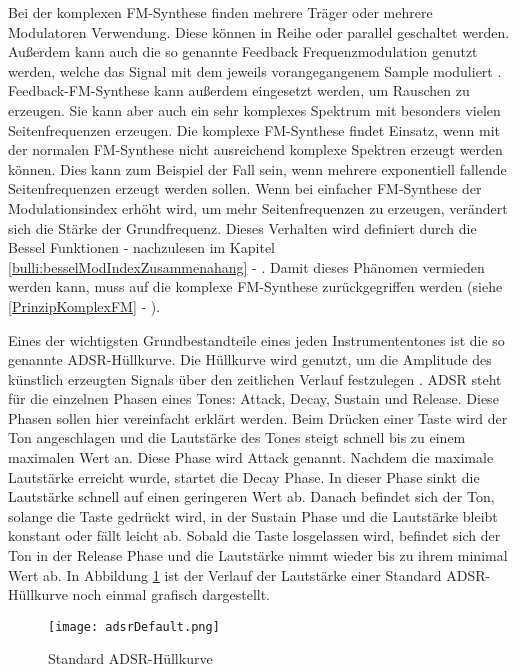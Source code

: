 Bei der komplexen FM-Synthese finden mehrere Träger oder mehrere Modulatoren Verwendung. Diese können in Reihe oder parallel geschaltet werden. Außerdem kann auch die so genannte Feedback Frequenzmodulation genutzt werden, welche das Signal mit dem jeweils vorangegangenem Sample moduliert \cite[S. 399 f.]{hornerPaper}. Feedback-FM-Synthese kann außerdem eingesetzt werden, um Rauschen zu erzeugen. Sie kann aber auch ein sehr komplexes Spektrum mit besonders vielen Seitenfrequenzen erzeugen. Die komplexe FM-Synthese findet Einsatz, wenn mit der normalen FM-Synthese nicht ausreichend komplexe Spektren erzeugt werden können. Dies kann zum Beispiel der Fall sein, wenn mehrere exponentiell fallende Seitenfrequenzen erzeugt werden sollen. Wenn bei einfacher FM-Synthese der Modulationsindex erhöht wird, um mehr Seitenfrequenzen zu erzeugen, verändert sich die Stärke der Grundfrequenz. Dieses Verhalten wird definiert durch die Bessel Funktionen - nachzulesen im Kapitel \ref{bulli:besselModIndexZusammenahang} - . Damit dieses Phänomen vermieden werden kann, muss auf die komplexe FM-Synthese zurückgegriffen werden (siehe \ref{PrinzipKomplexFM} - ).

Eines der wichtigsten Grundbestandteile eines jeden Instrumententones ist die so genannte ADSR-Hüllkurve. Die Hüllkurve wird genutzt, um die Amplitude des künstlich erzeugten Signals über den zeitlichen Verlauf festzulegen \cite[S. 532f]{chowningPaper}. ADSR steht für die einzelnen Phasen eines Tones: Attack, Decay, Sustain und Release. Diese Phasen sollen hier vereinfacht erklärt werden. Beim Drücken einer Taste wird der Ton angeschlagen und die Lautstärke des Tones steigt schnell bis zu einem maximalen Wert an. Diese Phase wird Attack genannt. Nachdem die maximale Lautstärke erreicht wurde, startet die Decay Phase. In dieser Phase sinkt die Lautstärke schnell auf einen geringeren Wert ab. Danach befindet sich der Ton, solange die Taste gedrückt wird, in der Sustain Phase und die Lautstärke bleibt konstant oder fällt leicht ab. Sobald die Taste losgelassen wird, befindet sich der Ton in der Release Phase und die Lautstärke nimmt wieder bis zu ihrem minimal Wert ab. In Abbildung \ref{fig:adsrDefault} ist der Verlauf der Lautstärke einer Standard ADSR-Hüllkurve noch einmal grafisch dargestellt.

\begin{figure} [ht]
\centering
  \texttt{[image: adsrDefault.png]}
\caption{Standard ADSR-Hüllkurve}
\label{fig:adsrDefault}
\end{figure}

